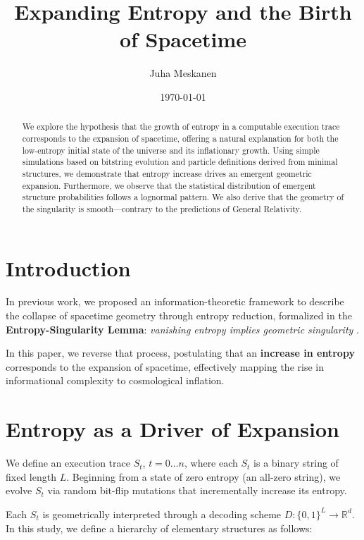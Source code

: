 \documentclass[11pt]{article}
\title{Expanding Entropy and the Birth of Spacetime}
\author{Juha Meskanen}
\date{\today}
\begin{document}
\maketitle

\begin{abstract}
    We explore the hypothesis that the growth of entropy in a computable execution trace corresponds to the expansion of spacetime, offering a natural explanation for both the low-entropy initial state of the universe and its inflationary growth. Using simple simulations based on bitstring evolution and particle definitions derived from minimal structures, we demonstrate that entropy increase drives an emergent geometric expansion. Furthermore, we observe that the statistical distribution of emergent structure probabilities follows a lognormal pattern. We also derive that the geometry of the singularity is smooth—contrary to the predictions of General Relativity.
\end{abstract}

\section{Introduction}

In previous work, we proposed an information-theoretic framework to describe the collapse of spacetime geometry through entropy reduction, formalized in the \textbf{Entropy-Singularity Lemma}: \textit{vanishing entropy implies geometric singularity} \cite{meskanen2020}.

In this paper, we reverse that process, postulating that an \textbf{increase in entropy} corresponds to the expansion of spacetime, effectively mapping the rise in informational complexity to cosmological inflation.

\section{Entropy as a Driver of Expansion}

We define an execution trace $S_t$, $t = 0 \ldots n$, where each $S_t$ is a binary string of fixed length $L$. Beginning from a state of zero entropy (an all-zero string), we evolve $S_t$ via random bit-flip mutations that incrementally increase its entropy.

Each $S_t$ is geometrically interpreted through a decoding scheme $D: \{0,1\}^L \to \mathbb{R}^d$. In this study, we define a hierarchy of elementary structures as follows:
\end{document}
